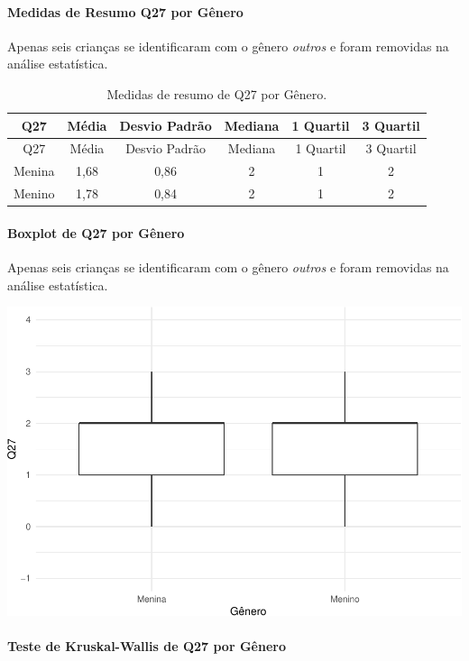 \documentclass[]{article}
\let\oldparagraph\paragraph
\renewcommand{\paragraph}[1]{\oldparagraph{#1}\mbox{}}
\begin{document}
\hypertarget{medidas-de-resumo-q27-por-guxeanero}{%
\paragraph{Medidas de Resumo Q27 por Gênero}\label{medidas-de-resumo-q27-por-guxeanero}}

Apenas seis crianças se identificaram com o gênero \emph{outros} e foram removidas na análise estatística.

\begin{longtable}[]{@{}cccccc@{}}
\caption{\label{tab:unnamed-chunk-794}Medidas de resumo de Q27 por Gênero.}\tabularnewline
\toprule
Q27 & Média & Desvio Padrão & Mediana & 1 Quartil & 3 Quartil\tabularnewline
\midrule
\endfirsthead
\toprule
Q27 & Média & Desvio Padrão & Mediana & 1 Quartil & 3 Quartil\tabularnewline
\midrule
\endhead
Menina & 1,68 & 0,86 & 2 & 1 & 2\tabularnewline
Menino & 1,78 & 0,84 & 2 & 1 & 2\tabularnewline
\bottomrule
\end{longtable}

\hypertarget{boxplot-de-q27-por-guxeanero}{%
\paragraph{Boxplot de Q27 por Gênero}\label{boxplot-de-q27-por-guxeanero}}

Apenas seis crianças se identificaram com o gênero \emph{outros} e foram removidas na análise estatística.

\begin{center}\includegraphics[width=0.75\linewidth]{relatorio_covid19_files/figure-latex/unnamed-chunk-795-1} \end{center}

\hypertarget{teste-de-kruskal-wallis-de-q27-por-guxeanero}{%
\paragraph{Teste de Kruskal-Wallis de Q27 por Gênero}\label{teste-de-kruskal-wallis-de-q27-por-guxeanero}}
\end{document}

